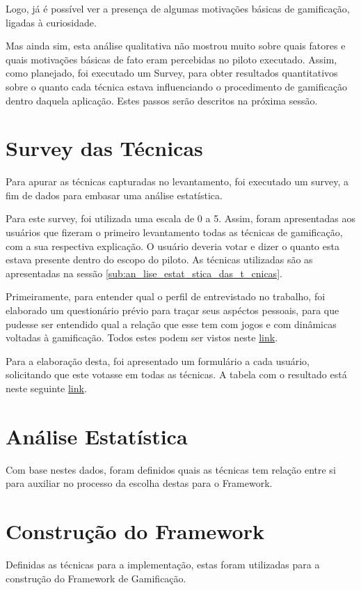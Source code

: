 Logo, já é possível ver a presença de algumas motivações básicas de gamificação, ligadas
à curiosidade.

Mas ainda sim, esta análise qualitativa não mostrou muito sobre quais fatores
e quais motivações básicas de fato eram percebidas no piloto executado. Assim,
como planejado, foi executado um Survey, para obter resultados quantitativos sobre
o quanto cada técnica estava influenciando o procedimento de gamificação dentro
daquela aplicação. Estes passos serão descritos na próxima sessão.

\section{Survey das Técnicas}
\label{sec:gamifição}
Para apurar as técnicas capturadas no levantamento, foi executado um survey, a fim de dados para
embasar uma análise estatística.

Para este survey, foi utilizada uma escala de 0 a 5. Assim, foram apresentadas aos usuários
que fizeram o primeiro levantamento todas as técnicas de gamificação, com a sua
respectiva explicação. O usuário deveria votar e dizer o quanto esta estava presente
dentro do escopo do piloto. As técnicas utilizadas são as apresentadas na sessão
\ref{sub:an_lise_estat_stica_das_t_cnicas}.

Primeiramente, para entender qual o perfil de entrevistado no trabalho, foi elaborado
um questionário prévio para traçar seus aspéctos pessoais,
para que pudesse ser entendido qual a relação que esse tem com jogos e com dinâmicas
voltadas à gamificação. Todos estes podem ser vistos neste \href{https://docs.google.com/spreadsheets/d/1galTU00NPQKaU7GRsYOciLhD0ZzIKH9BbJWyRdC3gbs/edit?usp=sharing}{link}.


Para a elaboração desta, foi apresentado um formulário a cada usuário, solicitando
que este votasse em todas as técnicas. A tabela com o resultado está neste seguinte
\href{https://docs.google.com/spreadsheets/d/1qROpsDaz32PZtkvCvmFTrqLVLgqhHR9F-Q5rcQ_pwys/edit?usp=sharing}{link}.



\section{Análise Estatística}
\label{sec:gamifição}
Com base nestes dados, foram definidos quais as técnicas tem relação entre si para auxiliar no processo
da escolha destas para o Framework.

\section{Construção do Framework}
\label{sec:gamifição}
Definidas as técnicas para a implementação, estas foram utilizadas para a construção do Framework
de Gamificação.

